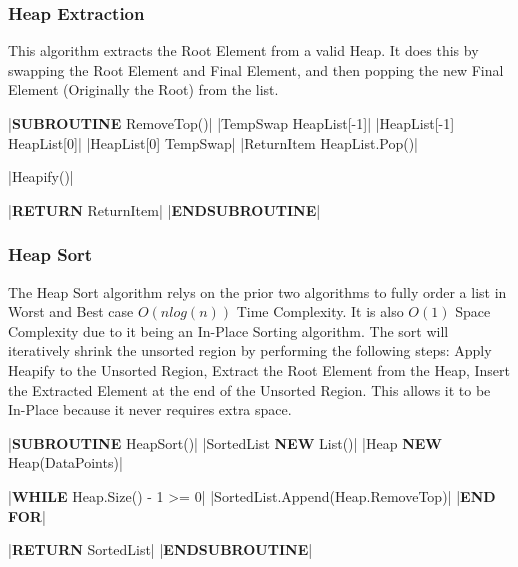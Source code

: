 \begin{flushleft}
                \vspace{0.5cm}
            \subsubsection{Heap Extraction}
                This algorithm extracts the Root Element from a valid Heap. It does this by swapping the Root Element and Final Element, and then
                popping the new Final Element (Originally the Root) from the list. 
                \vspace{0.2cm}

                \begin{pseudocode}
|\textbf{SUBROUTINE} RemoveTop()|
    |TempSwap \leftarrow HeapList[-1]|
    |HeapList[-1] \leftarrow HeapList[0]|
    |HeapList[0] \leftarrow TempSwap|
    |ReturnItem \leftarrow HeapList.Pop()|

    |Heapify()|

    |\textbf{RETURN} ReturnItem|
|\textbf{ENDSUBROUTINE}| 
                \end{pseudocode}

                \vspace{0.5cm}
            \subsubsection{Heap Sort}
                The Heap Sort algorithm relys on the prior two algorithms to fully order a list in Worst and Best case $O(nlog(n))$ Time Complexity. It 
                is also $O(1)$ Space Complexity due to it being an In-Place Sorting algorithm. The sort will iteratively shrink the unsorted region by 
                performing the following steps: Apply Heapify to the Unsorted Region, Extract the Root Element from the Heap, Insert the Extracted Element 
                at the end of the Unsorted Region. This allows it to be In-Place because it never requires extra space.
                \vspace{0.2cm}

                \begin{pseudocode}
|\textbf{SUBROUTINE} HeapSort()|
    |SortedList \leftarrow \textbf{NEW} List()|
    |Heap \leftarrow \textbf{NEW} Heap(DataPoints)|

    |\textbf{WHILE} Heap.Size() - 1 >= 0|
        |SortedList.Append(Heap.RemoveTop)|
    |\textbf{END FOR}|

    |\textbf{RETURN} SortedList|
|\textbf{ENDSUBROUTINE}|
                \end{pseudocode}


\end{flushleft}
